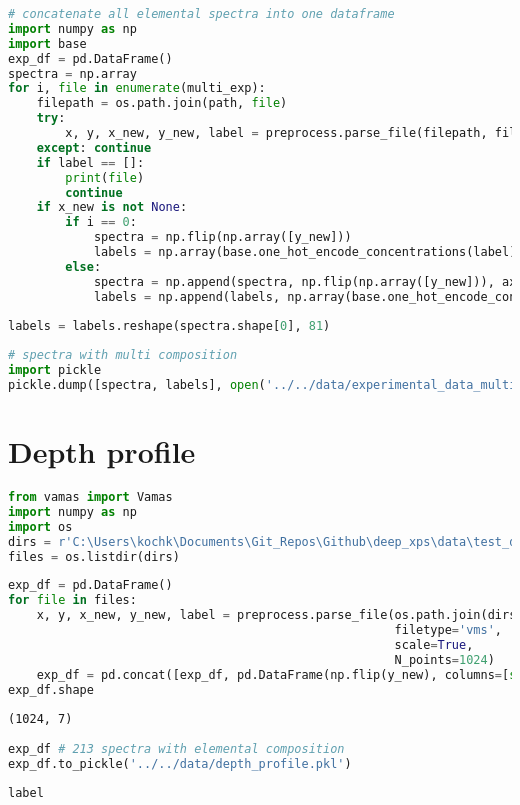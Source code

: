 \begin{lstlisting}[language=Python]
# concatenate all elemental spectra into one dataframe
import numpy as np
import base
exp_df = pd.DataFrame()
spectra = np.array
for i, file in enumerate(multi_exp):
    filepath = os.path.join(path, file)
    try:
        x, y, x_new, y_new, label = preprocess.parse_file(filepath, filetype='vms', scale=True, N_points=1024)
    except: continue
    if label == []: 
        print(file)
        continue
    if x_new is not None:
        if i == 0:
            spectra = np.flip(np.array([y_new]))
            labels = np.array(base.one_hot_encode_concentrations(label))
        else:
            spectra = np.append(spectra, np.flip(np.array([y_new])), axis=0)
            labels = np.append(labels, np.array(base.one_hot_encode_concentrations(label)), axis=0)
            
labels = labels.reshape(spectra.shape[0], 81)
\end{lstlisting}

\begin{lstlisting}[language=Python]
# spectra with multi composition
import pickle
pickle.dump([spectra, labels], open('../../data/experimental_data_multi.pkl', 'wb'))
\end{lstlisting}

\hypertarget{depth-profile}{%
\section*{Depth profile}\label{depth-profile}}

\begin{lstlisting}[language=Python]
from vamas import Vamas
import numpy as np
import os
dirs = r'C:\Users\kochk\Documents\Git_Repos\Github\deep_xps\data\test_data\Selected_Spectra\gradient_thickness'
files = os.listdir(dirs)
\end{lstlisting}

\begin{lstlisting}[language=Python]
exp_df = pd.DataFrame()
for file in files:
    x, y, x_new, y_new, label = preprocess.parse_file(os.path.join(dirs, file), 
                                                      filetype='vms',
                                                      scale=True,
                                                      N_points=1024)
    exp_df = pd.concat([exp_df, pd.DataFrame(np.flip(y_new), columns=[str('_'.join(label)+'_'+file.split('_')[2]+'_separate')])], axis=1)
exp_df.shape
\end{lstlisting}

\begin{lstlisting}
(1024, 7)
\end{lstlisting}


\begin{lstlisting}[language=Python]
exp_df # 213 spectra with elemental composition
exp_df.to_pickle('../../data/depth_profile.pkl')
\end{lstlisting}


\begin{lstlisting}[language=Python]
label
\end{lstlisting}
